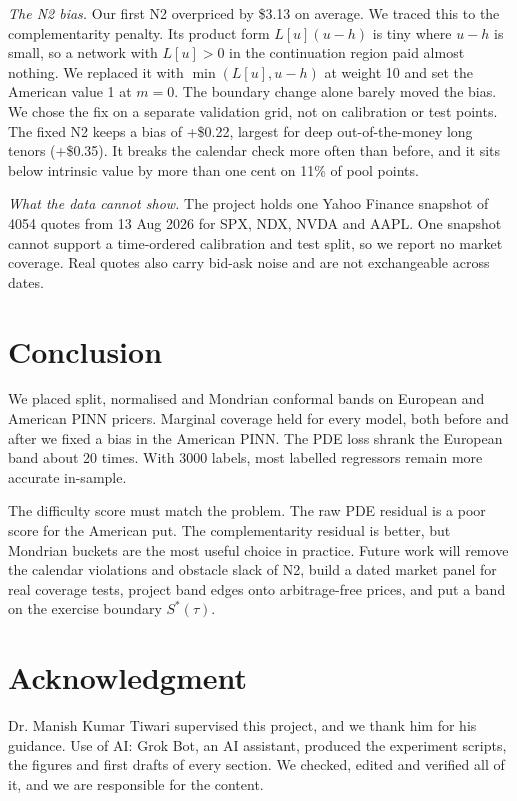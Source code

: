 \documentclass[conference]{IEEEtran}
\newcommand{\usd}{\$}
\begin{document}
\emph{The N2 bias.} Our first N2 overpriced by \usd 3.13 on average. We traced this to the complementarity penalty. Its product form $L[u](u-h)$ is tiny where $u-h$ is small, so a network with $L[u]>0$ in the continuation region paid almost nothing. We replaced it with $\min(L[u],u-h)$ at weight 10 and set the American value 1 at $m=0$. The boundary change alone barely moved the bias. We chose the fix on a separate validation grid, not on calibration or test points. The fixed N2 keeps a bias of +\usd 0.22, largest for deep out-of-the-money long tenors (+\usd 0.35). It breaks the calendar check more often than before, and it sits below intrinsic value by more than one cent on 11\% of pool points.

\emph{What the data cannot show.} The project holds one Yahoo Finance snapshot of 4054 quotes from 13 Aug 2026 for SPX, NDX, NVDA and AAPL. One snapshot cannot support a time-ordered calibration and test split, so we report no market coverage. Real quotes also carry bid-ask noise and are not exchangeable across dates.

\section{Conclusion}
We placed split, normalised and Mondrian conformal bands on European and American PINN pricers. Marginal coverage held for every model, both before and after we fixed a bias in the American PINN. The PDE loss shrank the European band about 20 times. With 3000 labels, most labelled regressors remain more accurate in-sample.

The difficulty score must match the problem. The raw PDE residual is a poor score for the American put. The complementarity residual is better, but Mondrian buckets are the most useful choice in practice. Future work will remove the calendar violations and obstacle slack of N2, build a dated market panel for real coverage tests, project band edges onto arbitrage-free prices, and put a band on the exercise boundary $S^*(\tau)$.

\section*{Acknowledgment}
Dr. Manish Kumar Tiwari supervised this project, and we thank him for his guidance. Use of AI: Grok Bot, an AI assistant, produced the experiment scripts, the figures and first drafts of every section. We checked, edited and verified all of it, and we are responsible for the content.



\end{document}
